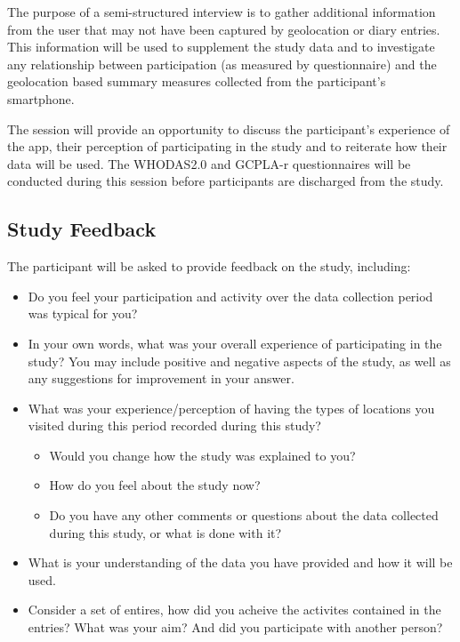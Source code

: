 The purpose of a semi-structured interview is to gather additional information from the user that may not have been captured by geolocation or diary entries. This information will be used to supplement the study data and to investigate any relationship between participation (as measured by questionnaire) and the geolocation based summary measures collected from the participant's smartphone.

The session will provide an opportunity to discuss the participant's experience of the app, their perception of participating in the study and to reiterate how their data will be used. The WHODAS2.0 and GCPLA-r questionnaires will be conducted during this session before participants are discharged from the study. 

\subsection{Study Feedback}
The participant will be asked to provide feedback on the study, including:
\begin{itemize}
    \item Do you feel your participation and activity over the data collection period was typical for you?
    \item In your own words, what was your overall experience of participating in the study? You may include positive and negative aspects of the study, as well as any suggestions for improvement in your answer.
    \item What was your experience/perception of having the types of locations you visited during this period recorded during this study?
        \begin{itemize}
            \item Would you change how the study was explained to you?
            \item How do you feel about the study now?
            \item Do you have any other comments or questions about the data collected during this study, or what is done with it?
        \end{itemize}
    \item What is your understanding of the data you have provided and how it will be used.
    \item Consider a set of entires, how did you acheive the activites contained in the entries? What was your aim? And did you participate with another person?

\end{itemize}
